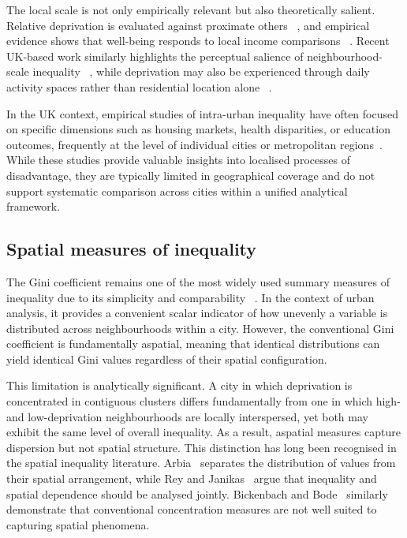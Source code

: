 \documentclass[11pt,journal,compsoc]{IEEEtran}
\begin{document}
The local scale is not only empirically relevant but also theoretically salient. Relative deprivation is evaluated against proximate others ~\cite{runciman1966relative,smith2012relative}, and empirical evidence shows that well-being responds to local income comparisons ~\cite{luttmer2005neighbors}. Recent UK-based work similarly highlights the perceptual salience of neighbourhood-scale inequality ~\cite{suss2023measuring}, while deprivation may also be experienced through daily activity spaces rather than residential location alone ~\cite{comber2022dynamic}.

In the UK context, empirical studies of intra-urban inequality have often focused on specific dimensions such as housing markets, health disparities, or education outcomes, frequently at the level of individual cities or metropolitan regions~\cite{bambra2014north,comber2022dynamic,suss2023measuring}. While these studies provide valuable insights into localised processes of disadvantage, they are typically limited in geographical coverage and do not support systematic comparison across cities within a unified analytical framework.

\subsection{Spatial measures of inequality}

The Gini coefficient remains one of the most widely used summary measures of inequality due to its simplicity and comparability ~\cite{cowell2011measuring}. In the context of urban analysis, it provides a convenient scalar indicator of how unevenly a variable is distributed across neighbourhoods within a city. However, the conventional Gini coefficient is fundamentally aspatial, meaning that identical distributions can yield identical Gini values regardless of their spatial configuration.

This limitation is analytically significant. A city in which deprivation is concentrated in contiguous clusters differs fundamentally from one in which high- and low-deprivation neighbourhoods are locally interspersed, yet both may exhibit the same level of overall inequality. As a result, aspatial measures capture dispersion but not spatial structure. This distinction has long been recognised in the spatial inequality literature. Arbia~\cite{arbia2001role} separates the distribution of values from their spatial arrangement, while Rey and Janikas~\cite{rey2005regional} argue that inequality and spatial dependence should be analysed jointly. Bickenbach and Bode~\cite{bickenbach2008disproportionality} similarly demonstrate that conventional concentration measures are not well suited to capturing spatial phenomena.
\end{document}
